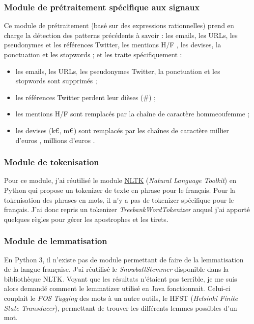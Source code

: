         \subsubsection{Module de prétraitement spécifique aux signaux}
            Ce module de prétraitement (basé sur des expressions rationnelles) prend en charge la détection des patterns précédents à savoir : les emails, les URLs, les pseudonymes et les références Twitter, les mentions \og H/F \fg, les devises, la ponctuation et les stopwords ; et les traite spécifiquement :
            \begin{itemize}
                \item les emails, les URLs, les pseudonymes Twitter, la ponctuation et les stopwords sont supprimés ;
                \item les références Twitter perdent leur dièses (\#) ;
                \item les mentions \og H/F \fg  sont remplacés par la chaîne de caractère \og hommeoufemme \fg ;
                \item les devises (k€, m€) sont remplacés par les chaînes de caractère \og millier d'euros \fg, \og millions d'euros \fg.
            \end{itemize}

        \subsubsection{Module de tokenisation}
            Pour ce module, j'ai réutilisé le module \href{http://www.nltk.org/}{NLTK} (\textit{Natural Language Toolkit}) en Python qui propose un tokenizer de texte en phrase pour le français. Pour la tokenisation des phrases en mots, il n'y a pas de tokenizer spécifique pour le français. J'ai donc repris un tokenizer \textit{TreebankWordTokenizer} auquel j'ai apporté quelques règles pour gérer les apostrophes et les tirets.

        \subsubsection{Module de lemmatisation}
            En Python 3, il n'existe pas de module permettant de faire de la lemmatisation de la langue française. J'ai réutilisé le \textit{SnowballStemmer} disponible dans la bibliothèque NLTK. Voyant que les résultats n'étaient pas terrible, je me suis alors demandé comment le lemmatizer utilisé en Java fonctionnait. Celui-ci couplait le \textit{POS Tagging} des mots à un autre outils, le HFST (\textit{Helsinki Finite State Transducer}), permettant de trouver les différents lemmes possibles d'un mot.\\

